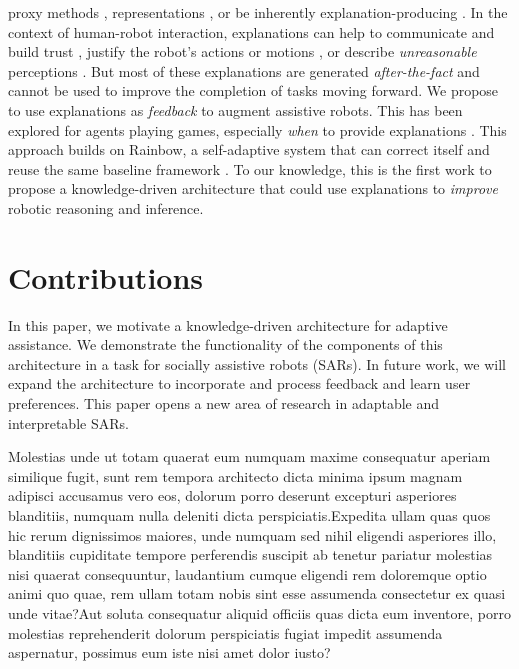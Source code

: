 \documentclass[letterpaper]{article} %
\begin{document}
proxy methods \cite{why-trust,grad-cam,visualizing}, representations
\cite{netdissect2017,cavs}, or be inherently explanation-producing
\cite{multimodal}.
In the context
of human-robot interaction, explanations can help to communicate and
build trust \cite{wang2016trust}, justify the robot's actions
\cite{stange2020effects} or motions \cite{dragan2013legibility}, or
describe \emph{unreasonable} perceptions \cite{gilpin-hri}.  But most of
these explanations are generated \emph{after-the-fact} and cannot be used
to improve the completion of tasks moving forward.  We propose to use explanations as \emph{feedback} to augment assistive
robots.  This has been explored for agents playing games, especially
\emph{when} to provide explanations \cite{li2020reasoning}.  This approach
builds on Rainbow, a self-adaptive system that can correct itself and
reuse the same baseline framework \cite{rainbow}.  To our knowledge,
this is the first work to propose a knowledge-driven architecture that could use explanations to \emph{improve} robotic reasoning and inference.
\section{Contributions}

In this paper, we motivate a knowledge-driven architecture for adaptive assistance. We demonstrate the functionality of the components of this architecture in a task for socially assistive robots (SARs). In future work, we will expand the architecture to incorporate and process feedback and learn user preferences. This paper opens a new area of research in adaptable and interpretable SARs.

  Molestias unde ut totam quaerat eum numquam maxime consequatur aperiam similique fugit, sunt rem tempora architecto dicta minima ipsum magnam adipisci accusamus vero eos, dolorum porro deserunt excepturi asperiores blanditiis, numquam nulla deleniti dicta perspiciatis.Expedita ullam quas quos hic rerum dignissimos maiores, unde numquam sed nihil eligendi asperiores illo, blanditiis cupiditate tempore perferendis suscipit ab tenetur pariatur molestias nisi quaerat consequuntur, laudantium cumque eligendi rem doloremque optio animi quo quae, rem ullam totam nobis sint esse assumenda consectetur ex quasi unde vitae?Aut soluta consequatur aliquid officiis quas dicta eum inventore, porro molestias reprehenderit dolorum perspiciatis fugiat impedit assumenda aspernatur, possimus eum iste nisi amet dolor iusto?\clearpage

\end{document}
